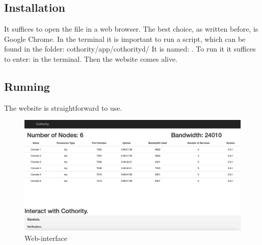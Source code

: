 \documentclass[11pt, a4paper, twoside, openright, openany]{article}
\begin{document}
\subsection{Installation}
It suffices to open the file  in a web browser. The best choice, as
written before, is Google Chrome.
\newline
In the terminal it is important to run a script, which can be found in the folder: cothority/app/cothorityd/
\newline
It is named: . To run it it suffices to enter:  in the terminal.
\newline \newline
Then the website comes alive.
\bigbreak

\subsection{Running}
The website is straightforward to use.
\newline

\begin{figure}[ht!]
\centering
\includegraphics[width=125mm]{interface.jpg}
\caption{Web-interface}
\end{figure}
\leavevmode \newline
\end{document}
